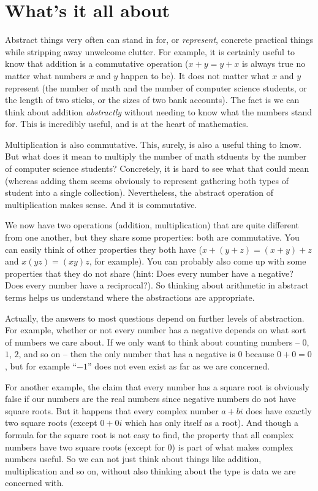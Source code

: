 \chapter{What's it all about}

Abstract things very often can stand in for, or \emph{represent}, concrete practical things while stripping away unwelcome clutter. For example, it is certainly useful to know that addition is a commutative operation ($x+y = y+x$ is always true no matter what numbers $x$ and $y$ happen to be). It does not matter what $x$ and $y$ represent (the number of math and the number of computer science students, or the length of two sticks, or the sizes of two bank accounts). The fact is we can think about addition \emph{abstractly} without needing to know what the numbers stand for. This is incredibly useful, and is at the heart of mathematics.

Multiplication is also commutative. 
This, surely, is also a useful thing to know. 
But what does it mean to multiply the number of math stduents by the number of computer science students? 
Concretely, it is hard to see what that could mean (whereas adding them seems obviously to represent  gathering both types of student into a single collection). 
Nevertheless, the abstract operation of multiplication makes sense. 
And it is commutative.

We now have two operations (addition, multiplication) that are quite different from one another, but they share some properties: both are commutative. You can easily think of other properties they both have ($x+(y+z)=(x+y)+z$ and $x(yz)=(xy)z$, for example). You can probably also come up with some properties that they do not share (hint: Does every number have a negative? Does every number have a reciprocal?). So thinking about arithmetic in abstract terms helps us understand where the abstractions are appropriate.

Actually, the answers to most questions depend on further levels of abstraction. For example, whether or not every number has a negative depends on what sort of numbers we care about. If we only want to think about counting numbers -- $0$, $1$, $2$, and so on -- then the only number that has a negative is $0$ because $0+0=0$, but for example ``$-1$'' does not even exist as far as we are concerned.

For another example, the claim that every number has a square root is obviously false if our numbers are the real numbers since negative numbers do not have square roots. But it happens that every complex number $a+bi$ does have exactly two square roots (except $0+0i$ which has only itself as a root). And though a formula for the square root is not easy to find, the property that all complex numbers have two square roots (except for $0$) is part of what makes complex numbers useful.	
So we can not just think about things like addition, multiplication and so on, without also thinking about the type is data we are concerned with.

